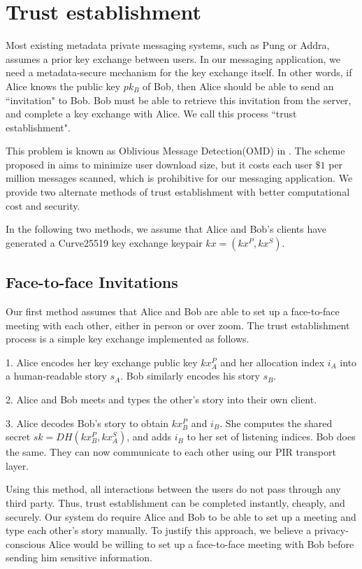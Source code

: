 \section{Trust establishment}

Most existing metadata private messaging systems, such as Pung or Addra, assumes a prior key exchange between users. In our messaging application, we need a metadata-secure mechanism for the key exchange itself. In other words, if Alice knows the public key $pk_B$ of Bob, then Alice should be able to send an ``invitation" to Bob. Bob must be able to retrieve this invitation from the server, and complete a key exchange with Alice. We call this process ``trust establishment".

This problem is known as Oblivious Message Detection(OMD) in \cite{liutromer2021}. The scheme proposed in \cite{liutromer2021} aims to minimize user download size, but it costs each user $\$ 1$ per million messages scanned, which is prohibitive for our messaging application. We provide two alternate methods of trust establishment with better computational cost and security.

In the following two methods, we assume that Alice and Bob's clients have generated a Curve25519 key exchange keypair $kx = (kx^P, kx^S)$.

\subsection{Face-to-face Invitations}
Our first method assumes that Alice and Bob are able to set up a face-to-face meeting with each other, either in person or over zoom. The trust establishment process is a simple key exchange implemented as follows.

1. Alice encodes her key exchange public key $kx_A^P$ and her allocation index $i_A$ into a human-readable story $s_A$. Bob similarly encodes his story $s_B$.

2. Alice and Bob meets and types the other's story into their own client. 

3. Alice decodes Bob's story to obtain $kx^P_B$ and $i_B$. She computes the shared secret $sk = DH(kx^P_B, kx^S_A)$, and adds $i_B$ to her set of listening indices. Bob does the same. They can now communicate to each other using our PIR transport layer.

Using this method, all interactions between the users do not pass through any third party. Thus, trust establishment can be completed instantly, cheaply, and securely. Our system do require Alice and Bob to be able to set up a meeting and type each other's story manually. To justify this approach, we believe a privacy-conscious Alice would be willing to set up a face-to-face meeting with Bob before sending him sensitive information.

